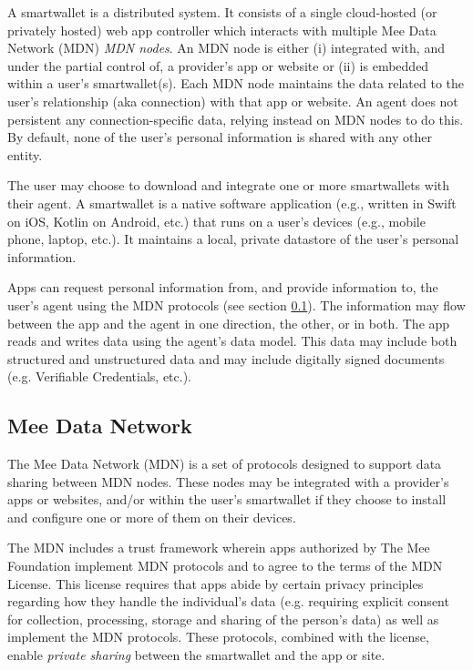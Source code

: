 \documentclass[11pt, oneside]{article}   	%
\begin{document}
A smartwallet is a distributed system. It consists of a single cloud-hosted (or privately hosted) web app controller which interacts with multiple Mee Data Network (MDN) \emph{MDN nodes}. An MDN node is either (i) integrated with, and under the partial control of, a provider's app or website or (ii) is embedded within a user's smartwallet(s). Each MDN node maintains the data related to the user's relationship (aka connection) with that app or website. An agent does not persistent any connection-specific data, relying instead on MDN nodes to do this. By default, none of the user's personal information is shared with any other entity. 

The user may choose to download and integrate one or more smartwallets with their agent. A smartwallet is a native software application (e.g., written in Swift on iOS, Kotlin on Android, etc.) that runs on a user's devices (e.g., mobile phone, laptop, etc.). It maintains a local, private datastore of the user's personal information. 

Apps can request personal information from, and provide information to, the user's agent using the MDN protocols (see section \ref{sec:MDN}). The information may flow between the app and the agent in one direction, the other, or in both. The app reads and writes data using the agent's data model. This data may include both structured and unstructured data and may include digitally signed documents (e.g. Verifiable Credentials, etc.). 

\subsection{Mee Data Network}\label{sec:MDN}

The Mee Data Network (MDN) is a set of protocols designed to support data sharing between MDN nodes. These nodes may be integrated with a provider's apps or websites, and/or within the user's smartwallet if they choose to install and configure one or more of them on their devices.

The MDN includes a trust framework wherein apps authorized by The Mee Foundation implement MDN protocols and to agree to the terms of the MDN License. This license requires that apps abide by certain privacy principles regarding how they handle the individual's data (e.g. requiring explicit consent for collection, processing, storage and sharing of the person's data) as well as implement the MDN protocols. These protocols, combined with the license, enable \emph{private sharing} between the smartwallet and the app or site. 
\end{document}
